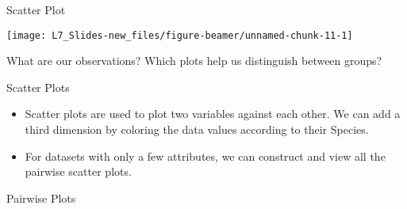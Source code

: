 \documentclass[ignorenonframetext,]{beamer}
\newenvironment{Shaded}{\begin{snugshade}}{\end{snugshade}}
\newcommand{\KeywordTok}[1]{\textcolor{white}{\textbf{{#1}}}}
\newcommand{\NormalTok}[1]{\textcolor{yellow}{{#1}}}
\newcommand{\DataTypeTok}[1]{\textcolor{yellow}{{#1}}}
\newcommand{\DecValTok}[1]{\textcolor{numbercolor}{{#1}}}
\newcommand{\StringTok}[1]{\textcolor{yellow}{{#1}}}
\begin{document}
\begin{frame}[fragile]{Scatter Plot}

\small

\begin{Shaded}
\end{Shaded}

\begin{center}\texttt{[image: L7\_Slides-new\_files/figure-beamer/unnamed-chunk-11-1]} \end{center}

What are our observations? Which plots help us distinguish between
groups?

\end{frame}

\begin{frame}{Scatter Plots}

\begin{itemize}
\item
  Scatter plots are used to plot two variables against each other. We
  can add a third dimension by coloring the data values according to
  their Species.
\item
  For datasets with only a few attributes, we can construct and view all
  the pairwise scatter plots.
\end{itemize}

\end{frame}

\begin{frame}[fragile]{Pairwise Plots}

\small

\begin{Shaded}
\end{Shaded}

\end{frame}
\end{document}
